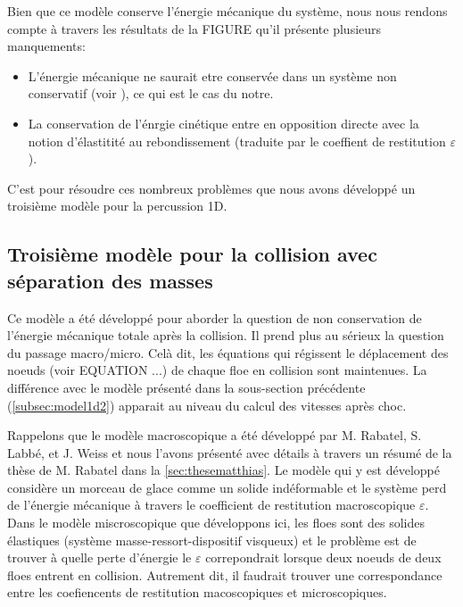 Bien que ce modèle conserve l'énergie mécanique du système, nous nous rendons compte à travers les résultats de la FIGURE qu'il présente plusieurs manquements:
\begin{itemize}
    \item L'énergie mécanique ne saurait etre conservée dans un système non conservatif (voir ), ce qui est le cas du notre.
    \item La conservation de l'énrgie cinétique entre en opposition directe avec la notion d'élastitité au rebondissement (traduite par le coeffient de restitution $\varepsilon$).
\end{itemize}

C'est pour résoudre ces nombreux problèmes que nous avons développé un troisième modèle pour la percussion 1D.





\subsection{Troisième modèle pour la collision avec séparation des masses}
\label{subsubsec:troisiemecol}

Ce modèle a été développé pour aborder la question de non conservation de l'énergie mécanique totale après la collision.
Il prend plus au sérieux la question du passage macro/micro. Celà dit, les équations qui régissent le déplacement des noeuds (voir EQUATION ...) de chaque floe en collision sont maintenues. La différence avec le modèle présenté dans la sous-section précédente (\cref{subsec:model1d2}) apparait au niveau du calcul des vitesses après choc.

Rappelons que le modèle macroscopique a été développé par M. Rabatel, S. Labbé, et J. Weiss \parencite{rabatel2015dynamics} et nous l'avons présenté avec détails à travers un résumé de la thèse de M. Rabatel \parencite{rabatel2015thesis} dans la \cref{sec:thesematthias}. Le modèle qui y est développé considère un morceau de glace comme un solide indéformable et le système perd de l'énergie mécanique à travers le coefficient de restitution macroscopique $\varepsilon$. Dans le modèle miscroscopique que développons ici, les floes sont des solides élastiques (système masse-ressort-dispositif visqueux) et le problème est de trouver à quelle perte d'énergie le $\varepsilon$ correpondrait lorsque deux noeuds de deux floes entrent en collision. Autrement dit, il faudrait trouver une correspondance entre les coefiencents de restitution macoscopiques et microscopiques.

